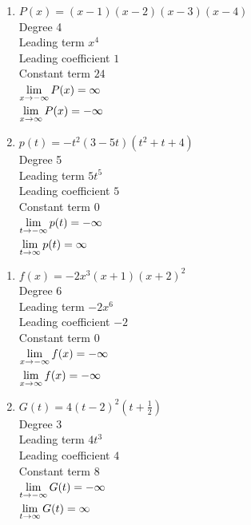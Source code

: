 \begin{multicols}{2}
\begin{enumerate}
\setcounter{enumi}{\value{HW}}


\item $P(x) = (x - 1)(x - 2)(x - 3)(x - 4)$\\
Degree 4 \\
Leading term $x^{4}$\\
Leading coefficient $1$\\
Constant term $24$\\
$\displaystyle{\lim_{x \rightarrow - \infty} P(x)  = \infty}$ \\
$\displaystyle{\lim_{x \rightarrow  \infty} P(x)  = -\infty}$ \\


\item $p(t) = -t^2(3 - 5t)(t^{2} + t + 4)$\\
Degree 5 \\
Leading term $5t^{5}$\\
Leading coefficient $5$\\
Constant term $0$\\
$\displaystyle{\lim_{t \rightarrow - \infty} p(t)  = -\infty}$ \\
$\displaystyle{\lim_{t \rightarrow  \infty} p(t)  = \infty}$ \\

\setcounter{HW}{\value{enumi}}
\end{enumerate}
\end{multicols}



\begin{multicols}{2}
\begin{enumerate}
\setcounter{enumi}{\value{HW}}

\item $f(x) = -2x^3(x+1)(x+2)^2$ \\
Degree 6 \\
Leading term $-2x^{6}$\\
Leading coefficient $-2$\\
Constant term $0$\\
$\displaystyle{\lim_{x \rightarrow - \infty} f(x)  = -\infty}$ \\
$\displaystyle{\lim_{x \rightarrow  \infty} f(x)  = -\infty}$ \\

\item $G(t) = 4(t-2)^2\left(t+\frac{1}{2}\right)$ \\
Degree 3 \\
Leading term $4t^3$\\
Leading coefficient $4$\\
Constant term $8$\\
$\displaystyle{\lim_{t \rightarrow - \infty} G(t)  = -\infty}$ \\
$\displaystyle{\lim_{t \rightarrow  \infty} G(t)  = \infty}$ \\


\setcounter{HW}{\value{enumi}}
\end{enumerate}
\end{multicols}

